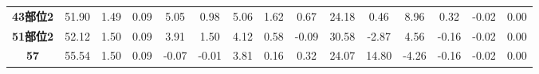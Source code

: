 \documentclass[withoutpreface,bwprint]{cumcmthesis} %
\begin{document}
\begin{appendices}
\begin{table}[!h]
\begin{tabular}{@{}ccccccccccccccc@{}}
			\textbf{43部位2}   & 51.90                                                          & 1.49                                                          & 0.09                                                         & 5.05                                                         & 0.98                                                         & 5.06                                                           & 1.62                                                           & 0.67                                                         & 24.18                                                        & 0.46                                                         & 8.96                                                            & 0.32                                                         & -0.02                                                         & 0.00                                                          \\
			\textbf{51部位2}   & 52.12                                                          & 1.50                                                          & 0.09                                                         & 3.91                                                         & 1.50                                                         & 4.12                                                           & 0.58                                                           & -0.09                                                        & 30.58                                                        & -2.87                                                        & 4.56                                                            & -0.16                                                        & -0.02                                                         & 0.00                                                          \\
			\textbf{57}      & 55.54                                                          & 1.50                                                          & 0.09                                                         & -0.07                                                        & -0.01                                                        & 3.81                                                           & 0.16                                                           & 0.32                                                         & 24.07                                                        & 14.80                                                        & -4.26                                                           & -0.16                                                        & -0.02                                                         & 0.00                                                          \\

\end{tabular}
\end{table}
\end{appendices}
\end{document}

